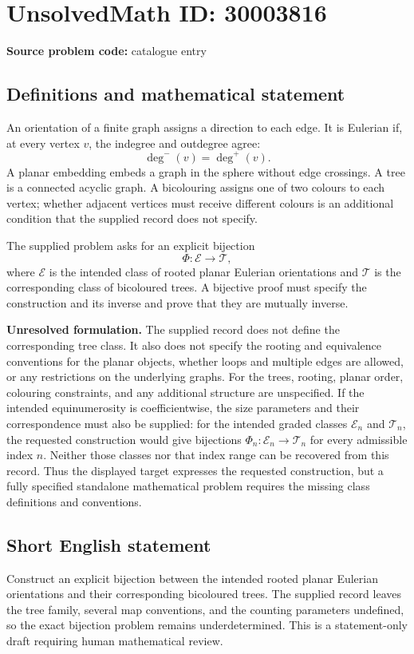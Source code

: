 \documentclass[11pt]{article}
\begin{document}
\section*{UnsolvedMath ID: 30003816}
\textbf{Source problem code:} catalogue entry
\subsection{Definitions and mathematical statement}
An orientation of a finite graph assigns a direction to each edge. It is Eulerian if, at every vertex \(v\), the indegree and outdegree agree:
\[
\deg^{-}(v)=\deg^{+}(v).
\]
A planar embedding embeds a graph in the sphere without edge crossings. A tree is a connected acyclic graph. A bicolouring assigns one of two colours to each vertex; whether adjacent vertices must receive different colours is an additional condition that the supplied record does not specify.

The supplied problem asks for an explicit bijection
\[
\Phi:\mathcal E\longrightarrow\mathcal T,
\]
where \(\mathcal E\) is the intended class of rooted planar Eulerian orientations and \(\mathcal T\) is the corresponding class of bicoloured trees. A bijective proof must specify the construction and its inverse and prove that they are mutually inverse.

\textbf{Unresolved formulation.} The supplied record does not define the corresponding tree class. It also does not specify the rooting and equivalence conventions for the planar objects, whether loops and multiple edges are allowed, or any restrictions on the underlying graphs. For the trees, rooting, planar order, colouring constraints, and any additional structure are unspecified. If the intended equinumerosity is coefficientwise, the size parameters and their correspondence must also be supplied: for the intended graded classes \(\mathcal E_n\) and \(\mathcal T_n\), the requested construction would give bijections \(\Phi_n:\mathcal E_n\to\mathcal T_n\) for every admissible index \(n\). Neither those classes nor that index range can be recovered from this record. Thus the displayed target expresses the requested construction, but a fully specified standalone mathematical problem requires the missing class definitions and conventions.
\subsection{Short English statement}
Construct an explicit bijection between the intended rooted planar Eulerian orientations and their corresponding bicoloured trees. The supplied record leaves the tree family, several map conventions, and the counting parameters undefined, so the exact bijection problem remains underdetermined. This is a statement-only draft requiring human mathematical review.
\end{document}

